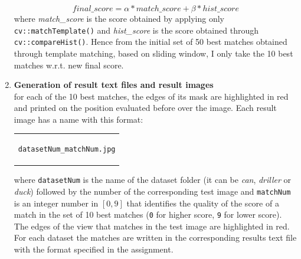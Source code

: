 \documentclass{article}
\begin{document}
\begin{enumerate}
{\begin{itemize}
{$$final\_score=\alpha*match\_score + \beta*hist\_score$$
where \textit{match\_score} is the score obtained by applying only \texttt{cv::matchTemplate()} and \textit{hist\_score} is the score obtained through \texttt{cv::compareHist()}. Hence from the initial set of 50 best matches obtained through template matching, based on sliding window, I only take the 10 best matches w.r.t. new final score.}
\end{itemize}
}
\item{\textbf{Generation of result text files and result images}\\
for each of the 10 best matches, the edges of its mask are highlighted in red and printed on the position evaluated before over the image. Each result image has a name with this format:
\begin{center}
\begin{tabular}{c}
\begin{lstlisting}[linewidth=120pt, basicstyle=\footnotesize\sffamily,]
datasetNum_matchNum.jpg
\end{lstlisting}
\end{tabular}
\end{center}
where \texttt{datasetNum} is the name of the dataset folder (it can be \textit{can}, \textit{driller} or \textit{duck}) followed by the number of the corresponding test image and \texttt{matchNum} is an integer number in $[0,9]$ that identifies the quality of the score of a match in the set of 10 best matches (\texttt{0} for higher score, \texttt{9} for lower score).\\
The edges of the view that matches in the test image are highlighted in red. For each dataset the matches are written in the corresponding results text file with the format specified in the assignment.}
\end{enumerate}
\end{document}
